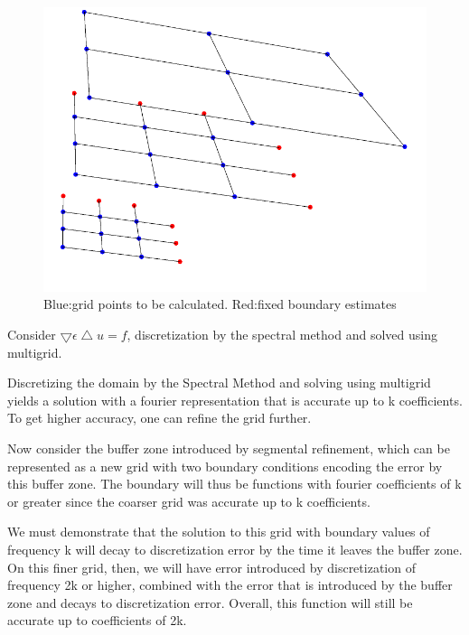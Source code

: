 \documentclass[12pt]{article}
\begin{document}
\begin{figure}
  \begin{center}
    \includegraphics[scale=0.4]{nsfpic.pdf}
  \end{center}
  \caption{\footnotesize{Blue:grid points to be calculated. Red:fixed boundary estimates}}
\end{figure}
    
    
    Consider $\bigtriangledown \epsilon \bigtriangleup u = f$, discretization by the spectral method and solved using multigrid.
    
    Discretizing the domain by the Spectral Method and solving using multigrid yields a solution with a fourier representation that is accurate up to k coefficients. To get higher accuracy, one can refine the grid further. 
    
    Now consider the buffer zone introduced by segmental refinement, which can be represented as a new grid with two boundary conditions encoding the error by this buffer zone. The boundary will thus be functions with fourier coefficients of k or greater since the coarser grid was accurate up to k coefficients. 
    
    We must demonstrate that the solution to this grid with boundary values of frequency k will decay to discretization error by the time it leaves the buffer zone. On this finer grid, then, we will have error introduced by discretization of frequency 2k or higher, combined with the error that is introduced by the buffer zone and decays to discretization error. Overall, this function will still be accurate up to coefficients of 2k.
    
\end{document}

